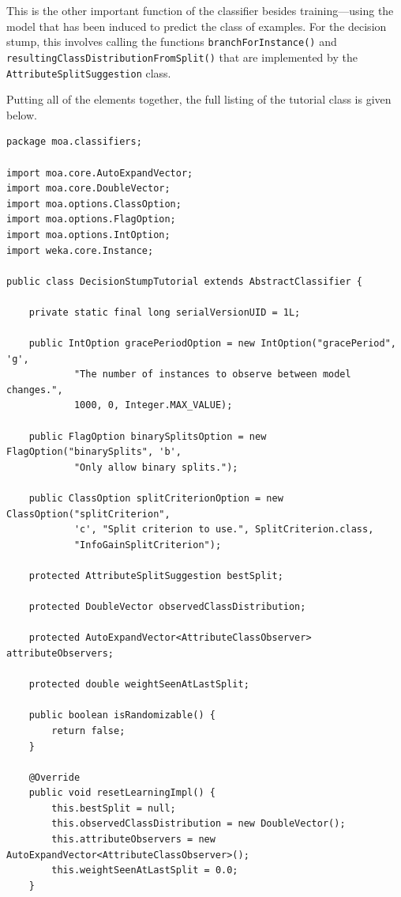 \documentclass[a4paper,12pt,twoside]{book}
\begin{document}
This is the other important function of the classifier besides training---using the model that has been induced to predict the class of examples. For the decision stump, this involves calling the functions \verb+branchForInstance()+ and \verb+resultingClassDistributionFromSplit()+ that are implemented by the \verb+AttributeSplitSuggestion+ class.

Putting all of the elements together, the full listing of the tutorial class is given below.

\begin{lstlisting}[caption={Full listing},label=lst:fullclassifier]
package moa.classifiers;

import moa.core.AutoExpandVector;
import moa.core.DoubleVector;
import moa.options.ClassOption;
import moa.options.FlagOption;
import moa.options.IntOption;
import weka.core.Instance;

public class DecisionStumpTutorial extends AbstractClassifier {

	private static final long serialVersionUID = 1L;

	public IntOption gracePeriodOption = new IntOption("gracePeriod", 'g',
			"The number of instances to observe between model changes.",
			1000, 0, Integer.MAX_VALUE);

	public FlagOption binarySplitsOption = new FlagOption("binarySplits", 'b',
			"Only allow binary splits.");

	public ClassOption splitCriterionOption = new ClassOption("splitCriterion",
			'c', "Split criterion to use.", SplitCriterion.class,
			"InfoGainSplitCriterion");

	protected AttributeSplitSuggestion bestSplit;

	protected DoubleVector observedClassDistribution;

	protected AutoExpandVector<AttributeClassObserver> attributeObservers;

	protected double weightSeenAtLastSplit;

	public boolean isRandomizable() {
		return false;
	}

	@Override
	public void resetLearningImpl() {
		this.bestSplit = null;
		this.observedClassDistribution = new DoubleVector();
		this.attributeObservers = new AutoExpandVector<AttributeClassObserver>();
		this.weightSeenAtLastSplit = 0.0;
	}


\end{lstlisting}
\end{document}
